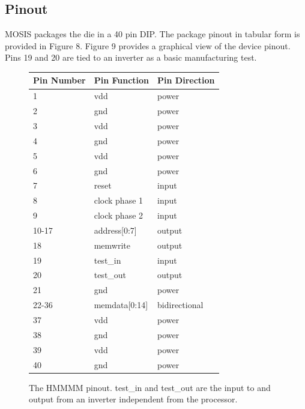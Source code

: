 \documentclass[12pt]{article}
\begin{document}
\subsection{Pinout}

MOSIS packages the die in a 40 pin DIP. The package pinout in tabular form is provided in Figure 8. Figure 9 provides a graphical view of the device pinout. Pins 19 and 20 are tied to an inverter as a basic manufacturing test.

\begin{figure}[H]
    \begin{center}
    \begin{tabular}{lll}
        Pin Number & Pin Function & Pin Direction \\
        \hline
        1 & vdd & power \\
        2 & gnd & power \\
        3 & vdd & power \\
        4 & gnd & power \\
        5 & vdd & power \\
        6 & gnd & power \\
        7 & reset & input \\
        8 & clock phase 1 & input \\
        9 & clock phase 2 & input \\
        10-17 & address[0:7] & output \\
        18 & memwrite & output \\
        19 & test\_in & input \\
        20 & test\_out & output \\
        21 & gnd & power \\
        22-36 & memdata[0:14] & bidirectional \\
        37 & vdd & power \\
        38 & gnd & power \\
        39 & vdd & power \\
        40 & gnd & power
    \end{tabular}
    \caption{The HMMMM pinout. test\_in and test\_out are the input to and output from an inverter independent from the processor.}
    \end{center}
    \label{fig:pinout}
\end{figure}
\end{document}

